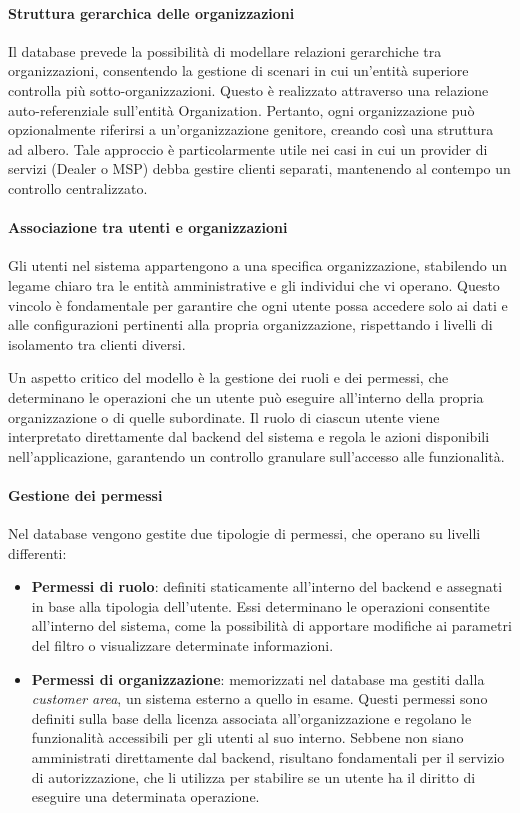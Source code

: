 \paragraph{Struttura gerarchica delle organizzazioni}
Il database prevede la possibilità di modellare relazioni gerarchiche tra organizzazioni, consentendo la gestione di scenari in cui un'entità superiore controlla più sotto-organizzazioni. Questo è realizzato attraverso una relazione auto-referenziale sull'entità Organization. Pertanto, ogni organizzazione può opzionalmente riferirsi a un'organizzazione genitore, creando così una struttura ad albero. Tale approccio è particolarmente utile nei casi in cui un provider di servizi (Dealer o MSP) debba gestire clienti separati, mantenendo al contempo un controllo centralizzato.

\paragraph{Associazione tra utenti e organizzazioni}
Gli utenti nel sistema appartengono a una specifica organizzazione, stabilendo un legame chiaro tra le entità amministrative e gli individui che vi operano. Questo vincolo è fondamentale per garantire che ogni utente possa accedere solo ai dati e alle configurazioni pertinenti alla propria organizzazione, rispettando i livelli di isolamento tra clienti diversi.

Un aspetto critico del modello è la gestione dei ruoli e dei permessi, che determinano le operazioni che un utente può eseguire all’interno della propria organizzazione o di quelle subordinate. Il ruolo di ciascun utente viene interpretato direttamente dal backend del sistema e regola le azioni disponibili nell’applicazione, garantendo un controllo granulare sull’accesso alle funzionalità.

\paragraph{Gestione dei permessi}
Nel database vengono gestite due tipologie di permessi, che operano su livelli differenti:
\begin{itemize}
  \item \textbf{Permessi di ruolo}: definiti staticamente all'interno del backend e assegnati in base alla tipologia dell’utente. Essi determinano le operazioni consentite all’interno del sistema, come la possibilità di apportare modifiche ai parametri del filtro o visualizzare determinate informazioni.
  \item \textbf{Permessi di organizzazione}: memorizzati nel database ma gestiti dalla \textit{customer area}, un sistema esterno a quello in esame. Questi permessi sono definiti sulla base della licenza associata all'organizzazione e regolano le funzionalità accessibili per gli utenti al suo interno. Sebbene non siano amministrati direttamente dal backend, risultano fondamentali per il servizio di autorizzazione, che li utilizza per stabilire se un utente ha il diritto di eseguire una determinata operazione.
\end{itemize}

